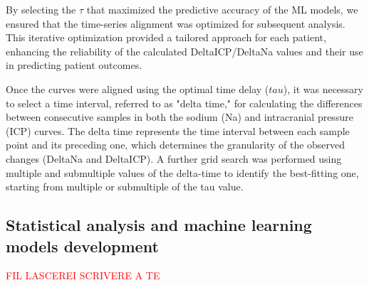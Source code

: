 
By selecting the $\tau$ that maximized the predictive accuracy of the ML models, we ensured that the time-series alignment was optimized for subsequent analysis. This iterative optimization provided a tailored approach for each patient, enhancing the reliability of the calculated DeltaICP/DeltaNa values and their use in predicting patient outcomes.


Once the curves were aligned using the optimal time delay ($tau$), it was necessary to select a time interval, referred to as "delta time," for calculating the differences between consecutive samples in both the sodium (Na) and intracranial pressure (ICP) curves. The delta time represents the time interval between each sample point and its preceding one, which determines the granularity of the observed changes (DeltaNa and DeltaICP). 
A further grid search was performed using multiple and submultiple values of the delta-time to identify the best-fitting one, starting from multiple or submultiple of the tau value.


\subsection{Statistical analysis and machine learning models development}
\textcolor{red}{FIL LASCEREI SCRIVERE A TE}

